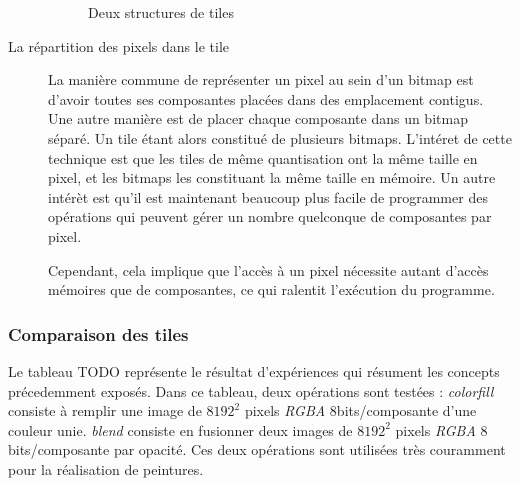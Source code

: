 \begin{description}
			\begin{figure}[h]
				\centering
				\caption{Deux structures de tiles}
				\label{fig:tilestruct}
			\end{figure}
				\item[La répartition des pixels dans le tile] La manière commune de représenter un pixel au sein d'un bitmap est d'avoir
				toutes ses composantes placées dans des emplacement contigus. Une autre manière est de placer chaque composante dans un
				bitmap séparé. Un tile étant alors constitué de plusieurs bitmaps. L'intéret de cette technique est que les tiles de même
				quantisation ont la même taille en pixel, et les bitmaps les constituant la même taille en mémoire. Un autre intérèt est
				qu'il est maintenant beaucoup plus facile de programmer des opérations qui peuvent gérer un nombre quelconque de composantes
				par pixel.

				Cependant, cela implique que l'accès à un pixel nécessite autant d'accès mémoires que de composantes, ce qui ralentit 
				l'exécution du programme. 
			\end{description}

		\subsubsection{Comparaison des tiles}
			Le tableau TODO représente le résultat d'expériences qui résument les concepts précedemment exposés. Dans ce tableau, deux opérations
			sont testées : \emph{colorfill} consiste à remplir une image de $8192^2$ pixels \emph{RGBA} 8bits/composante d'une couleur unie. \emph{blend} consiste 
			en fusionner deux images de $8192^2$ pixels \emph{RGBA} 8 bits/composante par opacité. Ces deux opérations 
			sont utilisées très couramment pour la réalisation de peintures. 

